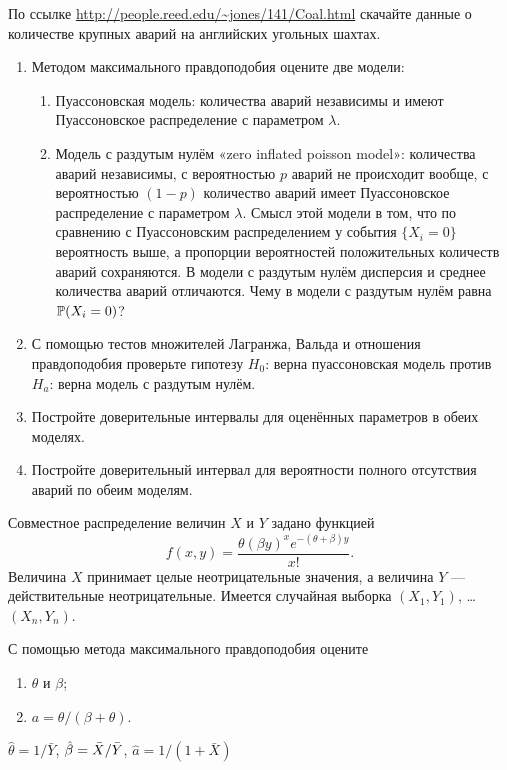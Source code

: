 \begin{problem}
\useR По ссылке \url{http://people.reed.edu/~jones/141/Coal.html} скачайте данные о количестве крупных аварий на английских угольных шахтах.
\begin{enumerate}
\item Методом максимального правдоподобия оцените две модели:
\begin{enumerate}
\item Пуассоновская модель: количества аварий независимы и имеют Пуассоновское распределение с параметром $\lambda$.
\item Модель с раздутым нулём  «zero inflated poisson model»: количества аварий независимы, с вероятностью $p$ аварий не происходит вообще, с вероятностью $(1-p)$ количество аварий имеет Пуассоновское распределение с параметром $\lambda$. Смысл этой модели в том, что по сравнению с Пуассоновским распределением у события $\{X_i=0\}$ вероятность выше, а пропорции вероятностей положительных количеств аварий сохраняются. В модели с раздутым нулём дисперсия и среднее количества аварий отличаются. Чему в модели с раздутым нулём равна $\P(X_i=0)$?
\end{enumerate}
\item С помощью тестов множителей Лагранжа, Вальда и отношения правдоподобия проверьте гипотезу $H_0$: верна пуассоновская модель против $H_{a}$: верна модель с раздутым нулём.
\item Постройте доверительные интервалы для оценённых параметров в обеих моделях.
\item Постройте доверительный интервал для вероятности полного отсутствия аварий по обеим моделям.
\end{enumerate}


\begin{sol}
\end{sol}
\end{problem}



\begin{problem}
Совместное распределение величин $X$ и $Y$ задано функцией
\[
f(x,y)=\frac{\theta(\beta y)^x e^{-(\theta+\beta)y}}{x!}.
\]
Величина $X$ принимает целые неотрицательные значения, а величина $Y$ — действительные неотрицательные. Имеется случайная выборка $(X_1,Y_1)$, \ldots $(X_n,Y_n)$.

С помощью метода максимального правдоподобия оцените
\begin{enumerate}
\item $\theta$ и $\beta$;
\item $a=\theta/(\beta+\theta)$.
\end{enumerate}


\begin{sol}
$\hat{\theta}=1/\bar{Y}$, $\hb=\bar{X}/\bar{Y}$, $\hat{a}=1/(1+\bar{X})$
\end{sol}
\end{problem}





